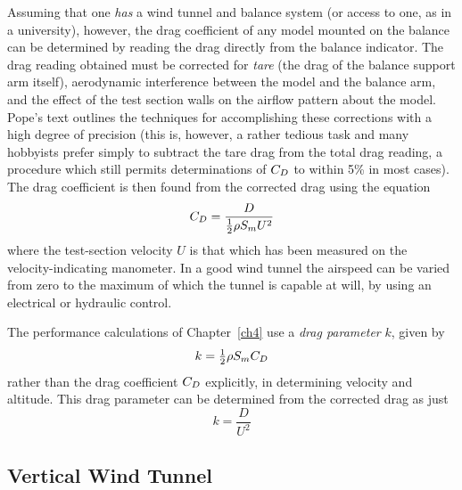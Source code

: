 Assuming that one \emph{has} a wind tunnel and balance system (or access to
one, as in a university), however, the drag coefficient of any model mounted
on the balance can be determined by reading the drag directly from the balance
indicator. The drag reading obtained must be corrected for \emph{tare} (the
drag of the balance support arm itself), aerodynamic interference between the
model and the balance arm, and the effect of the test section walls on the
airflow pattern about the model. Pope's text outlines the techniques for
accomplishing these corrections with a high degree of precision (this is,
however, a rather tedious task and many hobbyists prefer simply to subtract the
tare drag from the total drag reading, a procedure which still permits
determinations of $C_{D}$ to within 5\% in most cases). The drag coefficient is
then found from the corrected drag using the equation
\begin{equation}\label{ch3:eq:216}
C_{D} = \frac{D}{\tfrac{1}{2}\rho S_m U^{2}}
\end{equation}
where the test-section velocity $U$ is that which has been measured on the
velocity-indicating manometer. In a good wind tunnel the airspeed can be varied
from zero to the maximum of which the tunnel is capable at will, by using an
electrical or hydraulic control.

The performance calculations of Chapter~\ref{ch4} use a \emph{drag parameter}
$k$, given by
\begin{equation}\label{ch3:eq:217}
k = \tfrac{1}{2}\rho S_m C_{D}
\end{equation}
rather than the drag coefficient $C_{D}$ explicitly, in determining velocity and
altitude. This drag parameter can be determined from the corrected drag as just
\begin{equation}\label{ch3:eq:218}
k = \frac{D}{U^{2}}
\end{equation}

\subsection{Vertical Wind Tunnel}\label{ch3:sec:8.2}

